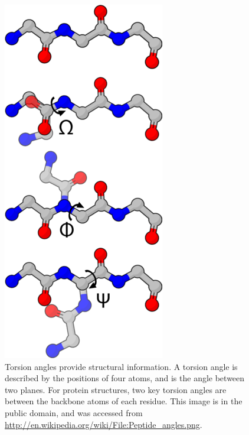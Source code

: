 \begin{figure}
  \includegraphics[scale=0.5]{figures/torsion_angles}
  \caption[Torsion angles provide structural information.]
          {Torsion angles provide structural information.
           A torsion angle is described by the positions of four
           atoms, and is the angle between two planes.  For protein
           structures, two key torsion angles are between the backbone
           atoms of each residue.
           This image is in the public domain, and was accessed
           from \url{http://en.wikipedia.org/wiki/File:Peptide_angles.png}.}
  \label{torsion_angles}
\end{figure}

\clearpage

